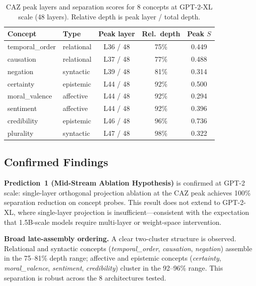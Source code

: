 \documentclass[11pt,a4paper]{article}
\begin{document}
\begin{table}[h]
	\centering
	\begin{tabular}{llccc}
		\toprule
		\textbf{Concept} & \textbf{Type} & \textbf{Peak layer} & \textbf{Rel.\ depth} & \textbf{Peak $S$} \\
		\midrule
		temporal\_order  & relational    & L36 / 48            & 75\%                 & 0.449             \\
		causation        & relational    & L37 / 48            & 77\%                 & 0.488             \\
		negation         & syntactic     & L39 / 48            & 81\%                 & 0.314             \\
		certainty        & epistemic     & L44 / 48            & 92\%                 & 0.500             \\
		moral\_valence   & affective     & L44 / 48            & 92\%                 & 0.294             \\
		sentiment        & affective     & L44 / 48            & 92\%                 & 0.396             \\
		credibility      & epistemic     & L46 / 48            & 96\%                 & 0.736             \\
		plurality        & syntactic     & L47 / 48            & 98\%                 & 0.322             \\
		\bottomrule
	\end{tabular}
	\caption{CAZ peak layers and separation scores for 8 concepts at GPT-2-XL scale
		(48 layers). Relative depth is peak layer / total depth.}
	\label{tab:results}
\end{table}

\subsection{Confirmed Findings}

\textbf{Prediction~1 (Mid-Stream Ablation Hypothesis)} is confirmed at GPT-2 scale:
single-layer orthogonal projection ablation at the CAZ peak achieves 100\% separation
reduction on concept probes. This result does not extend to GPT-2-XL, where single-layer
projection is insufficient---consistent with the expectation that 1.5B-scale models
require multi-layer or weight-space intervention.

\textbf{Broad late-assembly ordering.} A clear two-cluster structure is observed.
Relational and syntactic concepts (\textit{temporal\_order}, \textit{causation},
\textit{negation}) assemble in the 75--81\% depth range; affective and epistemic
concepts (\textit{certainty}, \textit{moral\_valence}, \textit{sentiment},
\textit{credibility}) cluster in the 92--96\% range. This separation is robust across
the 8 architectures tested.
\end{document}
